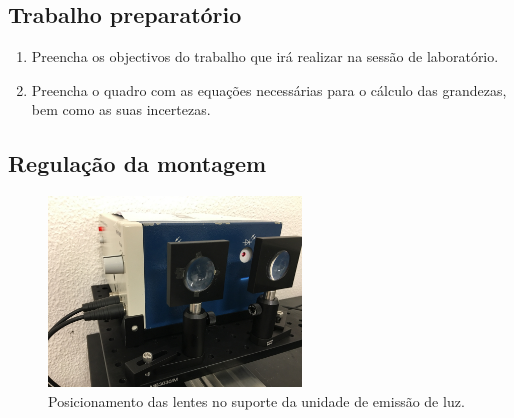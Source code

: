 \documentclass[a4paper,twoside,11pt]{report}      %
\begin{document}
\subsection{\sf Trabalho preparatório} 
\begin{enumerate}
\item Preencha os objectivos do trabalho que irá realizar na sessão de laboratório. 
\item Preencha o quadro com as equações necessárias para o cálculo das grandezas, bem como as suas incertezas. 
\end{enumerate}


\subsection{\sf Regulação da montagem}
 
 \begin{figure}[h!tb]  
	\centering 
	\includegraphics[width=0.6\textwidth]{Fig5}
	\caption{Posicionamento das lentes no suporte da unidade de emissão de luz. \label{fig:lentes}} 
\end{figure}
\end{document}
